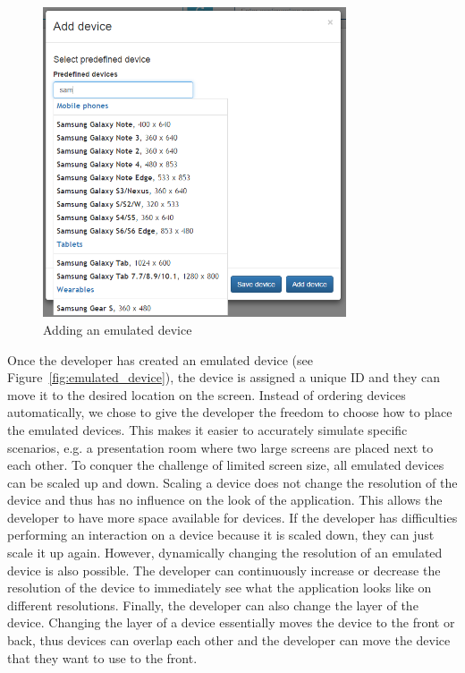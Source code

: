 \begin{figure}[H]
  \centering
    \includegraphics[width=0.8\textwidth]{images/screenshots/adding_device_predefined.png}
	\caption[Screenshot: Adding emulated devices]{Adding an emulated device}
	\label{fig:adding_emulated}
\end{figure}

Once the developer has created an emulated device (see Figure~\ref{fig:emulated_device}), the device is assigned a unique ID and they can move it to the desired location on the screen. Instead of ordering devices automatically, we chose to give the developer the freedom to choose how to place the emulated devices. This makes it easier to accurately simulate specific scenarios, e.g. a presentation room where two large screens are placed next to each other. To conquer the challenge of limited screen size, all emulated devices can be scaled up and down. Scaling a device does not change the resolution of the device and thus has no influence on the look of the application. This allows the developer to have more space available for devices. If the developer has difficulties performing an interaction on a device because it is scaled down, they can just scale it up again. However, dynamically changing the resolution of an emulated device is also possible. The developer can continuously increase or decrease the resolution of the device to immediately see what the application looks like on different resolutions. Finally, the developer can also change the layer of the device. Changing the layer of a device essentially moves the device to the front or back, thus devices can overlap each other and the developer can move the device that they want to use to the front.


